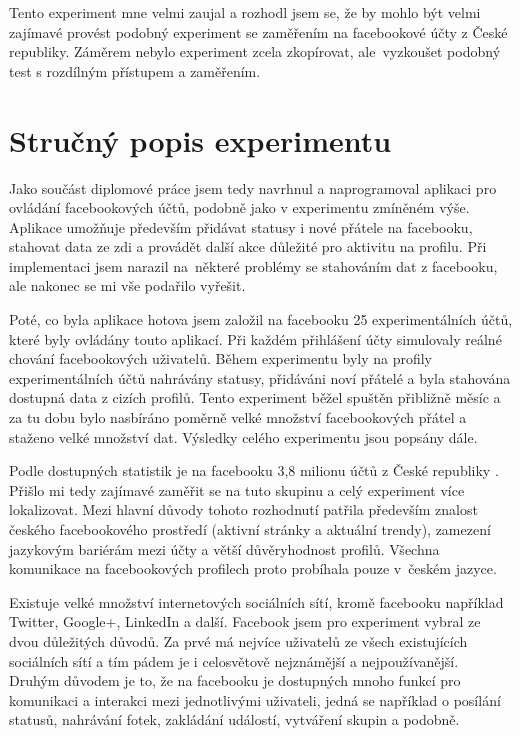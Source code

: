 \documentclass[thesis=M,czech]{FITthesis}[2013/05/10]
\begin{document}
Tento experiment mne velmi zaujal a rozhodl jsem se, že by mohlo být velmi zajímavé provést podobný experiment se zaměřením na facebookové účty z České republiky. Záměrem nebylo experiment zcela zkopírovat, ale~vyzkoušet podobný test s rozdílným přístupem a zaměřením. 

\section{Stručný popis experimentu}

Jako součást diplomové práce jsem tedy navrhnul a naprogramoval aplikaci pro ovládání facebookových účtů, podobně jako v experimentu zmíněném výše. Aplikace umožňuje především přidávat statusy i nové přátele na facebooku, stahovat data ze zdi a provádět další akce důležité pro aktivitu na profilu. Při implementaci jsem narazil na~některé problémy se stahováním dat z facebooku, ale nakonec se mi vše podařilo vyřešit.

Poté, co byla aplikace hotova jsem založil na facebooku 25 experimentálních účtů, které byly ovládány touto aplikací. Při každém přihlášení účty simulovaly reálné chování facebookových uživatelů. Během experimentu byly na profily experimentálních účtů nahrávány statusy, přidáváni noví přátelé a byla stahována dostupná data z cizích profilů. Tento experiment běžel spuštěn přibližně měsíc a za tu dobu bylo nasbíráno poměrně velké množství facebookových přátel a staženo velké množství dat. Výsledky celého experimentu jsou popsány dále.

Podle dostupných statistik je na facebooku 3,8 milionu účtů z České republiky \cite{web:fbCzechUsers}. Přišlo mi tedy zajímavé zaměřit se na tuto skupinu a celý experiment více lokalizovat. Mezi hlavní důvody tohoto rozhodnutí patřila především znalost českého facebookového prostředí (aktivní stránky a aktuální trendy), zamezení jazykovým bariérám mezi účty a větší důvěryhodnost profilů. Všechna komunikace na facebookových profilech proto probíhala pouze v~českém jazyce.

Existuje velké množství internetových sociálních sítí, kromě facebooku například Twitter, Google+, LinkedIn a další. Facebook jsem pro experiment vybral ze dvou důležitých důvodů. Za prvé má nejvíce uživatelů ze všech existujících sociálních sítí a tím pádem je i celosvětově nejznámější a nejpoužívanější. Druhým důvodem je to, že na facebooku je dostupných mnoho funkcí pro komunikaci a interakci mezi jednotlivými uživateli, jedná se například o posílání statusů, nahrávání fotek, zakládání událostí, vytváření skupin a podobně.
\end{document}
